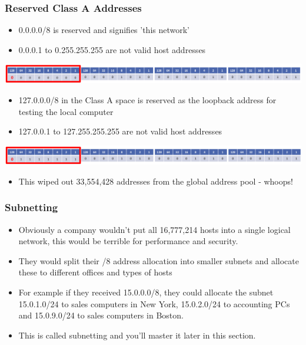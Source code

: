 \documentclass[pdflatex,compress]{beamer}
\begin{document}
\begin{frame}
	\frametitle{Reserved Class A Addresses}
	\begin{itemize}
		\item 0.0.0.0/8 is reserved and signifies 'this network'
		\item 0.0.0.1 to 0.255.255.255 are not valid host addresses
	\end{itemize}

	\begin{center}
		\includegraphics[width=1\linewidth]{img/img03}
	\end{center}

	\begin{itemize}
		\item 127.0.0.0/8 in the Class A space is reserved as the loopback address
		for testing the local computer
		\item 127.0.0.1 to 127.255.255.255 are not valid host addresses
	\end{itemize}

	\begin{center}
		\includegraphics[width=1\linewidth]{img/img04}
	\end{center}
	
	\begin{itemize}
		\item This wiped out 33,554,428 addresses from the global address pool - whoops!
	\end{itemize}
\end{frame}

\begin{frame}
	\frametitle{Subnetting}
	\begin{itemize}
		\item Obviously a company wouldn't put all 16,777,214 hosts into a single logical network, this would be terrible for performance and security.
		\item They would split their /8 address allocation into smaller subnets and allocate these to different offices and types of hosts
		\item For example if they received 15.0.0.0/8, they could allocate the subnet 15.0.1.0/24 to sales computers in New York, 15.0.2.0/24 to accounting PCs and 15.0.9.0/24 to sales computers in Boston.
		\item This is called subnetting and you’ll master it later in this section.
	\end{itemize}
\end{frame}
\end{document}
